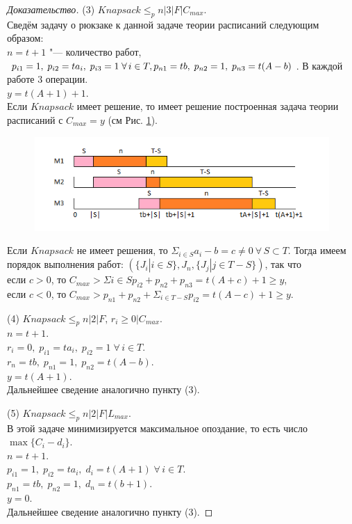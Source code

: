 \documentclass[a4paper,12pt]{article}
\theoremstyle{plain} %
\theoremstyle{definition} %
\theoremstyle{remark} %
\begin{document}
\begin{proof}[Доказательство]
	\par\bigskip
	(3) $Knapsack \le_p n|3|F|C_{max}$.\\
	Сведём задачу о рюкзаке к данной задаче теории расписаний следующим образом:\\
	$n = t + 1$ "--- количество работ,\\
	$p_{i1} = 1, \; p_{i2} = ta_i, \; p_{i3} = 1 \; \forall \, i \in T,\\
	p_{n1} = tb, \; p_{n2} = 1, \; p_{n3} = t(A - b)$. В каждой работе 3 операции.\\
	$y = t(A + 1) + 1$.\\
	Если $Knapsack$ имеет решение, то имеет решение построенная задача теории расписаний с $C_{max} = y$ (см Рис. \ref{fig_3}).
	\begin{figure}[h!]
		\begin{center}
			\includegraphics[scale=0.65]{pic_3.png}
			\caption[]{}
			\label{fig_3}
		\end{center}
	\end{figure}
	Если $Knapsack$ не имеет решения, то $\Sigma_{i \in S}a_i - b = c \ne 0 \: \forall \, S \subset T$. Тогда имеем порядок выполнения работ: $(\{J_i| i \in S\}, J_n, \{J_j| j \in T-S\})$, так что\\
	если $c > 0$, то $C_{max} > \Sigma{i \in S}p_{i2} + p_{n2} + p_{n3} = t(A + c) + 1 \ge y$,\\
	если $c < 0$, то $C_{max} > p_{n1} + p_{n2} + \Sigma_{i \in T-S}p_{i2} = t(A - c) + 1 \ge y$.\\
	
	\par\bigskip
	(4) $Knapsack \le_p n|2|F, \, r_i \ge 0|C_{max}$.\\
	$n = t + 1$.\\
	$r_i = 0, \; p_{i1} = ta_i, \; p_{i2} = 1 \; \forall \, i \in T$.\\
	$r_n = {tb}, \; p_{n1} = 1, \; p_{n2} = t(A-b)$.\\
	$y=t(A + 1)$.\\
	Дальнейшее сведение аналогично пункту (3).
	
	\par\bigskip
	(5) $Knapsack \le_p n|2|F|L_{max}$.\\
	В этой задаче минимизируется максимальное опоздание, то есть число $\max\{C_i - d_i\}$.\\
	$n = t + 1$.\\
	$p_{i1} = 1, \; p_{i2} = ta_i, \; d_i = t(A + 1) \; \forall \, i \in T$.\\
	$p_{n1} = tb, \; p_{n2} = 1, \; d_n = t(b + 1)$.\\	
	$y = 0$.\\
	Дальнейшее сведение аналогично пункту (3).
	

\end{proof}
\end{document}
